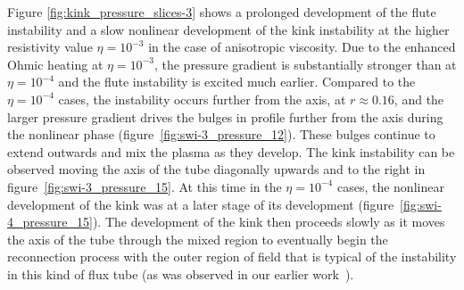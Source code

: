 \documentclass[fleqn,usenatbib]{mnras}
\begin{document}
Figure \ref{fig:kink_pressure_slices-3} shows a prolonged development of the
flute instability and a slow nonlinear development of the kink instability at
the higher resistivity value $\eta=10^{-3}$ in the case of anisotropic
viscosity. Due to the enhanced Ohmic heating at $\eta=10^{-3}$, the pressure
gradient is substantially stronger than at $\eta=10^{-4}$ and the flute
instability is excited much earlier. Compared to the $\eta=10^{-4}$ cases, the
instability occurs further from the axis, at $r\approx0.16$, and the larger
pressure gradient drives the bulges in profile further from the axis during the
nonlinear phase (figure~\ref{fig:swi-3_pressure_12}). These bulges continue to
extend outwards and mix the plasma as they develop. The kink instability can be
observed moving the axis of the tube diagonally upwards and to the right in
figure~\ref{fig:swi-3_pressure_15}. At this time in the $\eta=10^{-4}$ cases,
the nonlinear development of the kink was at a later stage of its development
(figure~\ref{fig:swi-4_pressure_15}). The development of the kink then proceeds
slowly as it moves the axis of the tube through the mixed region to eventually
begin the reconnection process with the outer region of field that is typical
of the instability in this kind of flux tube (as was observed in our earlier
work~\citep[][]{quinnEffectAnisotropicViscosity2020}). 
\end{document}
